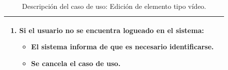 \begin{table}[H]
\begin{center}
\begin{tabular}{|p{3.5cm}|p{10cm}|}
{\begin{enumerate}
\begin{itemize}
	    \item Se cancela el caso de uso.
	  \end{itemize}
	\item Si el usuario no se encuentra logueado en el sistema:
	\begin{itemize}
	  \item El sistema informa de que es necesario identificarse.
	  \item Se cancela el caso de uso.
	\end{itemize}
	\end{enumerate}
	}\\
      \hline
    \end{tabular}
  \end{center}
\caption{Descripción del caso de uso: Edición de elemento tipo vídeo.}
\end{table}


